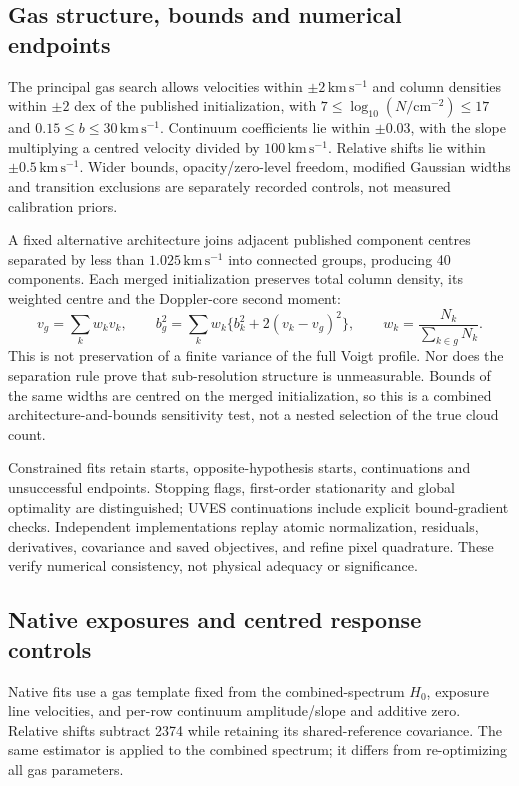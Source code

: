 \subsection{Gas structure, bounds and numerical endpoints}
\label{sec:optimization}
The principal gas search allows velocities within $\pm2\,\mathrm{km\,s^{-1}}$ and column densities within $\pm2$ dex of the published initialization, with $7\leq\log_{10}(N/\mathrm{cm^{-2}})\leq17$ and $0.15\leq b\leq30\,\mathrm{km\,s^{-1}}$. Continuum coefficients lie within $\pm0.03$, with the slope multiplying a centred velocity divided by $100\,\mathrm{km\,s^{-1}}$. Relative shifts lie within $\pm0.5\,\mathrm{km\,s^{-1}}$. Wider bounds, opacity/zero-level freedom, modified Gaussian widths and transition exclusions are separately recorded controls, not measured calibration priors.

A fixed alternative architecture joins adjacent published component centres separated by less than $1.025\,\mathrm{km\,s^{-1}}$ into connected groups, producing 40 components. Each merged initialization preserves total column density, its weighted centre and the Doppler-core second moment:
\begin{equation}
 v_g=\sum_k w_kv_k,\qquad
 b_g^2=\sum_k w_k\{b_k^2+2(v_k-v_g)^2\},\qquad
 w_k=\frac{N_k}{\sum_{k\in g}N_k}.
\end{equation}
This is not preservation of a finite variance of the full Voigt profile. Nor does the separation rule prove that sub-resolution structure is unmeasurable. Bounds of the same widths are centred on the merged initialization, so this is a combined architecture-and-bounds sensitivity test, not a nested selection of the true cloud count.

Constrained fits retain starts, opposite-hypothesis starts, continuations and unsuccessful endpoints. Stopping flags, first-order stationarity and global optimality are distinguished; UVES continuations include explicit bound-gradient checks. Independent implementations replay atomic normalization, residuals, derivatives, covariance and saved objectives, and refine pixel quadrature. These verify numerical consistency, not physical adequacy or significance.

\subsection{Native exposures and centred response controls}
\label{sec:orders}
Native fits use a gas template fixed from the combined-spectrum $H_0$, exposure line velocities, and per-row continuum amplitude/slope and additive zero. Relative shifts subtract 2374 while retaining its shared-reference covariance. The same estimator is applied to the combined spectrum; it differs from re-optimizing all gas parameters.

